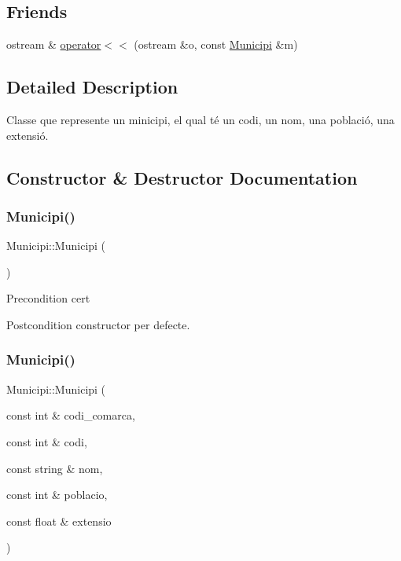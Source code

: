 \subsection*{Friends}
\begin{DoxyCompactItemize}
\item 
ostream \& \hyperlink{classMunicipi_a68b2ff825cd32c02ea4e845a460bdb4a}{operator$<$$<$} (ostream \&o, const \hyperlink{classMunicipi}{Municipi} \&m)
\end{DoxyCompactItemize}


\subsection{Detailed Description}
Classe que represente un minicipi, el qual té un codi, un nom, una població, una extensió. 

\subsection{Constructor \& Destructor Documentation}
\mbox{\label{classMunicipi_a4670585ae0cca72832d40e58b85a9ab7}} 
\subsubsection{\texorpdfstring{Municipi()}{Municipi()}\hspace{0.1cm}{\footnotesize\ttfamily [1/2]}}
{\footnotesize\ttfamily Municipi\+::\+Municipi (\begin{DoxyParamCaption}{ }\end{DoxyParamCaption})}

\begin{DoxyPrecond}{Precondition}
cert 
\end{DoxyPrecond}
\begin{DoxyPostcond}{Postcondition}
constructor per defecte. 
\end{DoxyPostcond}
\mbox{\label{classMunicipi_a3367dd3a452ef5484ad19cdb305eea6c}} 
\subsubsection{\texorpdfstring{Municipi()}{Municipi()}\hspace{0.1cm}{\footnotesize\ttfamily [2/2]}}
{\footnotesize\ttfamily Municipi\+::\+Municipi (\begin{DoxyParamCaption}\item[{const int \&}]{codi\+\_\+comarca,  }\item[{const int \&}]{codi,  }\item[{const string \&}]{nom,  }\item[{const int \&}]{poblacio,  }\item[{const float \&}]{extensio }\end{DoxyParamCaption})}

